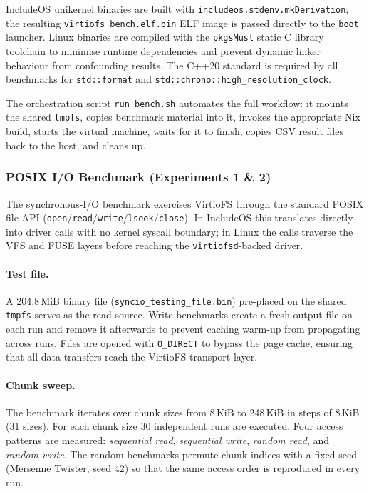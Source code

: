 IncludeOS unikernel binaries are built with
\texttt{includeos.stdenv.mkDerivation}; the resulting
\texttt{virtiofs\_bench.elf.bin} ELF image is passed directly to the
\texttt{boot} launcher.  Linux binaries are compiled with the
\texttt{pkgsMusl} static C library toolchain to minimise runtime
dependencies and prevent dynamic linker behaviour from confounding
results.  The C++20 standard is required by all benchmarks for
\texttt{std::format} and \texttt{std::chrono::high\_resolution\_clock}.

The orchestration script \texttt{run\_bench.sh} automates the full
workflow: it mounts the shared \texttt{tmpfs}, copies benchmark material
into it, invokes the appropriate Nix build, starts the virtual machine,
waits for it to finish, copies CSV result files back to the host, and
cleans up.

\subsubsection{POSIX I/O Benchmark (Experiments 1 \& 2)}
\label{sec:posix_setup}

The synchronous-I/O benchmark exercises VirtioFS through the standard
POSIX file API (\texttt{open}/\texttt{read}/\texttt{write}/\texttt{lseek}/\texttt{close}).
In IncludeOS this translates directly into driver calls with no kernel
syscall boundary; in Linux the calls traverse the VFS and FUSE layers
before reaching the \texttt{virtiofsd}-backed driver.

\paragraph{Test file.}  A 204.8\,MiB binary file
(\texttt{syncio\_testing\_file.bin}) pre-placed on the shared
\texttt{tmpfs} serves as the read source.  Write benchmarks create a
fresh output file on each run and remove it afterwards to prevent caching
warm-up from propagating across runs.  Files are opened with
\texttt{O\_DIRECT} to bypass the page cache, ensuring that all data
transfers reach the VirtioFS transport layer.

\paragraph{Chunk sweep.}  The benchmark iterates over chunk sizes from
8\,KiB to 248\,KiB in steps of 8\,KiB (31 sizes).  For each chunk size
30 independent runs are executed.  Four access patterns are measured:
\emph{sequential read}, \emph{sequential write}, \emph{random read}, and
\emph{random write}.  The random benchmarks permute chunk indices with a
fixed seed (Mersenne Twister, seed 42) so that the same access order is
reproduced in every run.

